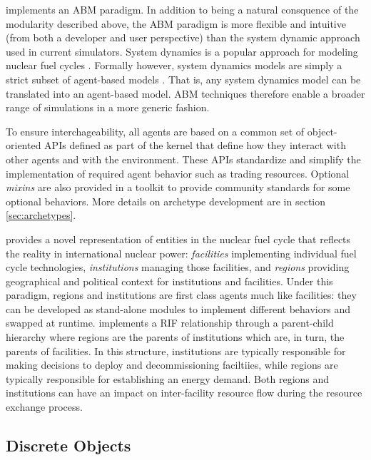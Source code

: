\Cyclus implements an \acrlong{ABM} paradigm.  In addition to being a natural
consquence of the modularity described above, the \gls{ABM} paradigm is more
flexible and intuitive (from both a developer and user perspective) than the
system dynamic approach used in current simulators.  System dynamics is a
popular approach for modeling nuclear fuel cycles
\cite{jacobson_vision_2009,van_den_durpel_daness_2009,guerin_impact_2009,guerin_benchmark_2009}.
Formally however, system dynamics models are simply a strict subset of
agent-based models \cite{macal_agent-based_2010}.  That is, any system
dynamics model can be translated into an agent-based model.  \gls{ABM}
techniques therefore enable a broader range of simulations in a more generic
fashion.

To ensure interchageability, all agents are based on a common set of
object-oriented \glspl{API} defined as part of the \Cyclus kernel that define
how they interact with other agents and with the environment.  These
\glspl{API} standardize and simplify the implementation of required agent
behavior such as trading resources.  Optional \textit{mixins} are also
provided in a toolkit to provide community standards for some optional
behaviors.  More details on archetype development are in section
\ref{sec:archetypes}.

\Cyclus provides a novel representation of entities in the nuclear fuel cycle
that reflects the reality in international nuclear power: \textit{facilities}
implementing individual fuel cycle technologies, \textit{institutions}
managing those facilities, and \textit{regions} providing geographical and
political context for institutions and facilities.  Under this paradigm,
regions and institutions are first class agents much like facilities: they can
be developed as stand-alone modules to implement different behaviors and
swapped at runtime.  \Cyclus implements a \gls{RIF} relationship through a
parent-child hierarchy where regions are the parents of institutions which
are, in turn, the parents of facilities.  In this structure, institutions are
typically responsible for making decisions to deploy and decommissioning
faciltiies, while regions are typically responsible for establishing an energy
demand.  Both regions and institutions can have an impact on inter-facility
resource flow during the resource exchange process.

\subsection{Discrete Objects}

